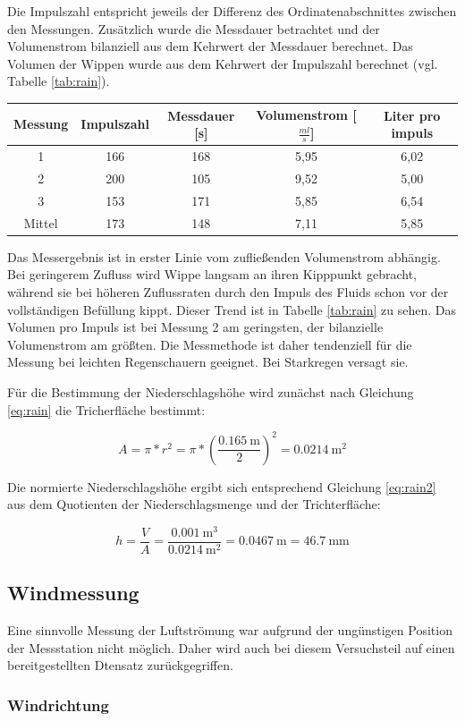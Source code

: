 Die Impulszahl entspricht jeweils der Differenz des Ordinatenabschnittes zwischen den Messungen. Zusätzlich wurde die Messdauer betrachtet und der Volumenstrom bilanziell aus dem Kehrwert der Messdauer berechnet. Das Volumen der Wippen wurde aus dem Kehrwert der Impulszahl berechnet (vgl. Tabelle \ref{tab:rain}).

 \begin{center}
 	\begin{tabular}{c|c|c|c|c}
 		\label{tab:rain}
 		\textbf{Messung} & \textbf{Impulszahl} & \textbf{Messdauer} [s] & \textbf{Volumenstrom} [$\frac{ml}{s}$] & \textbf{Liter pro impuls}\\
 		\hline
 		1 & 166 & 168 & 5,95 & 6,02\\
 		2 & 200 & 105 & 9,52 & 5,00\\
 		3 & 153 & 171 & 5,85 & 6,54\\
 		Mittel & 173 & 148 & 7,11 & 5,85
 	\end{tabular}
 \end{center}

Das Messergebnis ist in erster Linie vom zufließenden Volumenstrom abhängig. Bei geringerem Zufluss wird Wippe  langsam an ihren Kipppunkt gebracht, während sie bei höheren Zuflussraten durch den Impuls des Fluids schon vor der vollständigen Befüllung kippt. Dieser Trend ist in Tabelle \ref{tab:rain} zu sehen. Das Volumen pro Impuls ist bei Messung 2 am geringsten, der bilanzielle Volumenstrom am größten. Die Messmethode ist daher tendenziell für die Messung bei leichten Regenschauern geeignet. Bei Starkregen versagt sie.

Für die Bestimmung der Niederschlagshöhe wird zunächst nach Gleichung \ref{eq:rain} die Tricherfläche bestimmt:

\begin{equation}
	\label{eq:rain}
	A= \pi * r^2= \pi * (\frac{\SI{0,165}{\meter}}{2})^2 = \SI{0,0214}{\square\meter}
\end{equation}

Die normierte Niederschlagshöhe ergibt sich entsprechend Gleichung \ref{eq:rain2} aus dem Quotienten der Niederschlagsmenge und der Trichterfläche:

\begin{equation}
	\label{eq:rain2}
	h = \frac{V}{A} = \frac{\SI{0,001}{\cubic\meter}}{\SI{0,0214}{\square\meter}} = \SI{0,0467}{\meter} = \SI{46,7}{\milli\meter}
\end{equation}

\subsection{Windmessung}
Eine sinnvolle Messung der Luftströmung war aufgrund der ungünstigen Position der Messstation nicht möglich. Daher wird auch bei diesem Versuchsteil auf einen bereitgestellten Dtensatz zurückgegriffen.

\subsubsection{Windrichtung}
